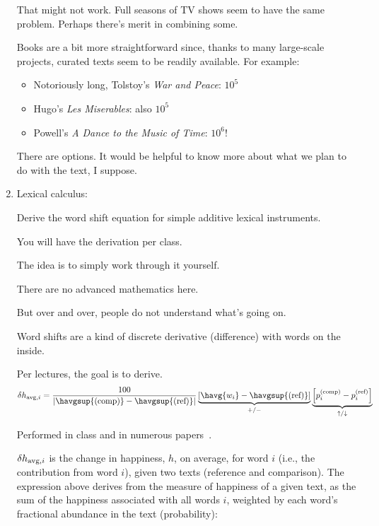 \begin{enumerate}
That might not work. Full seasons of TV shows seem to have the same problem. Perhaps there's merit in combining some.

Books are a bit more straightforward since, thanks to many large-scale projects, curated texts seem to be readily available. For example:

\begin{itemize}
	\item Notoriously long, Tolstoy's \textit{War and Peace}: $10^5$
	\item Hugo's \textit{Les Miserables}: also $10^5$
	\item Powell's 	\textit{A Dance to the Music of Time}: $10^6$!
\end{itemize}

There are options. It would be helpful to know more about what we plan to do with the text, I suppose.

	
	
   \solutionend

\item

  Lexical calculus:

  Derive the word shift equation for simple additive lexical instruments.

  You will have the derivation per class.

  The idea is to simply work through it yourself.

  There are no advanced mathematics here.

  But over and over, people do not understand what's going on.

  Word shifts are a kind of discrete derivative (difference) with words on the inside.

  Per lectures, the goal is to derive.
  $$
  \delta h_{\textnormal{avg},i}
  =
  \frac{100}{
    \left|
    \havgsup{(\rm comp)} - \havgsup{(\textnormal{ref})}
    \right|
  }
  \underbrace{
    \left[
      \havg{w_{i}} - \havgsup{(\textnormal{ref})}
      \right]
  }_{+/-}
  \underbrace{
    \left[
      p_{i}^{(\textnormal{comp})} - p_{i}^{(\textnormal{ref})}
      \right]
  }_{\uparrow/\downarrow}
  $$

  Performed in class and in numerous papers~\cite{dodds2009c,dodds2011e,dodds2015a}.

  
   \solutionstart

   
$\delta h_{\textnormal{avg},i}$ is the change in happiness, $h$, on average, for word $i$ (i.e., the contribution from word $i$), given two texts (reference and comparison). The expression above derives from the measure of happiness of a given text, as the sum of the happiness associated with all words $i$, weighted by each word's fractional abundance in the text (probability):


\end{enumerate}
